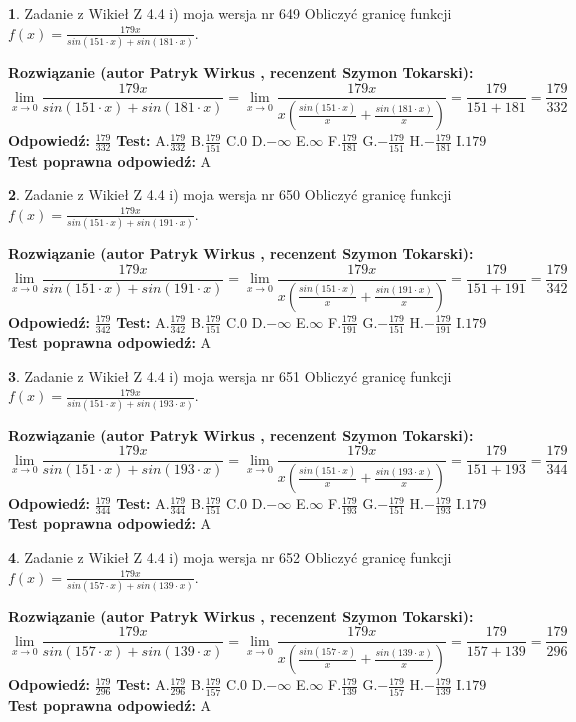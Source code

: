 \documentclass[12pt, a4paper]{article}
\theoremstyle{definition} %
\newtheorem{zad}{}
\newcommand{\zadStart}[1]{\begin{zad}#1\newline}
\newcommand{\zadStop}{\end{zad}}
\newcommand{\rozwStart}[2]{\noindent \textbf{Rozwiązanie (autor #1 , recenzent #2): }\newline}
\newcommand{\rozwStop}{\newline}
\newcommand{\odpStart}{\noindent \textbf{Odpowiedź:}\newline}
\newcommand{\odpStop}{\newline}
\newcommand{\testStart}{\noindent \textbf{Test:}\newline}
\newcommand{\testStop}{\newline}
\newcommand{\kluczStart}{\noindent \textbf{Test poprawna odpowiedź:}\newline}
\newcommand{\kluczStop}{\newline}
\begin{document}
\zadStart{Zadanie z Wikieł Z 4.4 i) moja wersja nr 649}
Obliczyć granicę funkcji $f(x)=\frac{179x}{sin(151\cdot x) +sin(181\cdot x)}$.
\zadStop
\rozwStart{Patryk Wirkus}{Szymon Tokarski}
$$\lim\limits_{x\to 0}\frac{179x}{sin(151\cdot x) +sin(181\cdot x)}=\lim\limits_{x\to 0}\frac{179x}{x(\frac{sin(151\cdot x)}{x}+\frac{sin(181\cdot x)}{x})}=\frac{179}{151+181} = \frac{179}{332}$$
\rozwStop
\odpStart
$\frac{179}{332}$
\odpStop
\testStart
A.$\frac{179}{332}$
B.$\frac{179}{151}$
C.$0$
D.$-\infty$
E.$\infty$
F.$\frac{179}{181}$
G.$-\frac{179}{151}$
H.$-\frac{179}{181}$
I.$179$
\testStop
\kluczStart
A
\kluczStop



\zadStart{Zadanie z Wikieł Z 4.4 i) moja wersja nr 650}
Obliczyć granicę funkcji $f(x)=\frac{179x}{sin(151\cdot x) +sin(191\cdot x)}$.
\zadStop
\rozwStart{Patryk Wirkus}{Szymon Tokarski}
$$\lim\limits_{x\to 0}\frac{179x}{sin(151\cdot x) +sin(191\cdot x)}=\lim\limits_{x\to 0}\frac{179x}{x(\frac{sin(151\cdot x)}{x}+\frac{sin(191\cdot x)}{x})}=\frac{179}{151+191} = \frac{179}{342}$$
\rozwStop
\odpStart
$\frac{179}{342}$
\odpStop
\testStart
A.$\frac{179}{342}$
B.$\frac{179}{151}$
C.$0$
D.$-\infty$
E.$\infty$
F.$\frac{179}{191}$
G.$-\frac{179}{151}$
H.$-\frac{179}{191}$
I.$179$
\testStop
\kluczStart
A
\kluczStop



\zadStart{Zadanie z Wikieł Z 4.4 i) moja wersja nr 651}
Obliczyć granicę funkcji $f(x)=\frac{179x}{sin(151\cdot x) +sin(193\cdot x)}$.
\zadStop
\rozwStart{Patryk Wirkus}{Szymon Tokarski}
$$\lim\limits_{x\to 0}\frac{179x}{sin(151\cdot x) +sin(193\cdot x)}=\lim\limits_{x\to 0}\frac{179x}{x(\frac{sin(151\cdot x)}{x}+\frac{sin(193\cdot x)}{x})}=\frac{179}{151+193} = \frac{179}{344}$$
\rozwStop
\odpStart
$\frac{179}{344}$
\odpStop
\testStart
A.$\frac{179}{344}$
B.$\frac{179}{151}$
C.$0$
D.$-\infty$
E.$\infty$
F.$\frac{179}{193}$
G.$-\frac{179}{151}$
H.$-\frac{179}{193}$
I.$179$
\testStop
\kluczStart
A
\kluczStop



\zadStart{Zadanie z Wikieł Z 4.4 i) moja wersja nr 652}
Obliczyć granicę funkcji $f(x)=\frac{179x}{sin(157\cdot x) +sin(139\cdot x)}$.
\zadStop
\rozwStart{Patryk Wirkus}{Szymon Tokarski}
$$\lim\limits_{x\to 0}\frac{179x}{sin(157\cdot x) +sin(139\cdot x)}=\lim\limits_{x\to 0}\frac{179x}{x(\frac{sin(157\cdot x)}{x}+\frac{sin(139\cdot x)}{x})}=\frac{179}{157+139} = \frac{179}{296}$$
\rozwStop
\odpStart
$\frac{179}{296}$
\odpStop
\testStart
A.$\frac{179}{296}$
B.$\frac{179}{157}$
C.$0$
D.$-\infty$
E.$\infty$
F.$\frac{179}{139}$
G.$-\frac{179}{157}$
H.$-\frac{179}{139}$
I.$179$
\testStop
\kluczStart
A
\kluczStop
\end{document}
